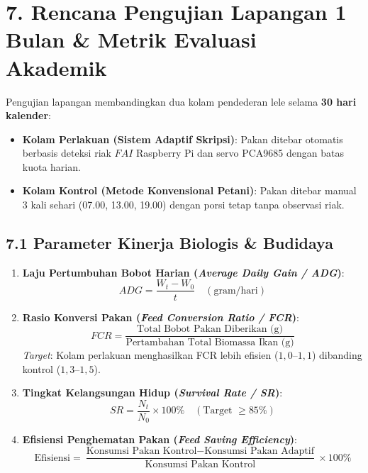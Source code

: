 \documentclass[10pt,a4paper]{article}
\providecommand{\text}[1]{\mbox{#1}}
\begin{document}
\section*{7. Rencana Pengujian Lapangan 1 Bulan \& Metrik Evaluasi Akademik}

Pengujian lapangan membandingkan dua kolam pendederan lele selama \textbf{30 hari kalender}:
\begin{itemize}
    \item \textbf{Kolam Perlakuan (Sistem Adaptif Skripsi)}: Pakan ditebar otomatis berbasis deteksi riak $FAI$ Raspberry Pi dan servo PCA9685 dengan batas kuota harian.
    \item \textbf{Kolam Kontrol (Metode Konvensional Petani)}: Pakan ditebar manual 3 kali sehari (07.00, 13.00, 19.00) dengan porsi tetap tanpa observasi riak.
\end{itemize}

\subsection*{7.1 Parameter Kinerja Biologis \& Budidaya}
\begin{enumerate}
    \item \textbf{Laju Pertumbuhan Bobot Harian (\textit{Average Daily Gain / ADG})}:
    \begin{equation}
    ADG = \frac{W_t - W_0}{t} \quad (\text{gram/hari})
    \end{equation}
    \item \textbf{Rasio Konversi Pakan (\textit{Feed Conversion Ratio / FCR})}:
    \begin{equation}
    FCR = \frac{\text{Total Bobot Pakan Diberikan (g)}}{\text{Pertambahan Total Biomassa Ikan (g)}}
    \end{equation}
    \textit{Target}: Kolam perlakuan menghasilkan FCR lebih efisien ($1,0\text{--}1,1$) dibanding kontrol ($1,3\text{--}1,5$).
    \item \textbf{Tingkat Kelangsungan Hidup (\textit{Survival Rate / SR})}:
    \begin{equation}
    SR = \frac{N_t}{N_0} \times 100\% \quad (\text{Target } \ge 85\%)
    \end{equation}
    \item \textbf{Efisiensi Penghematan Pakan (\textit{Feed Saving Efficiency})}:
    \begin{equation}
    \text{Efisiensi} = \frac{\text{Konsumsi Pakan Kontrol} - \text{Konsumsi Pakan Adaptif}}{\text{Konsumsi Pakan Kontrol}} \times 100\%
    \end{equation}
\end{enumerate}
\end{document}
